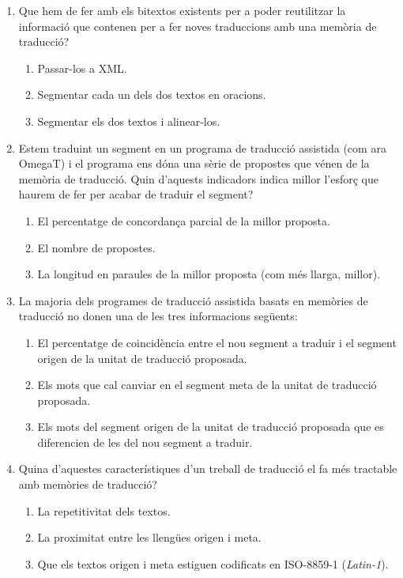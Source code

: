 \begin{enumerate}
\item Que hem de fer amb els bitextos existents per a poder
  reutilitzar la informació que contenen per a fer noves traduccions
  amb una memòria de traducció?
  \begin{enumerate}
  \item Passar-los a XML.
  \item Segmentar cada un dels dos textos en oracions.
  \item Segmentar els dos textos i alinear-los.
  \end{enumerate}

\item Estem traduint un segment en un programa de traducció assistida
  (com ara OmegaT) i el programa ens dóna una sèrie de propostes que
  vénen de la memòria de traducció. Quin d'aquests indicadors indica
  millor l'esforç que haurem de fer per acabar de traduir el segment?
  \begin{enumerate}
  \item El percentatge de concordança parcial de la millor proposta.
  \item El nombre de propostes.
  \item La longitud en paraules de la millor proposta (com més llarga,
    millor).
  \end{enumerate}

\item La majoria dels programes de traducció assistida basats en
  memòries de traducció no donen una de les tres informacions
  següents:
  \begin{enumerate}

  \item El percentatge de coincidència entre el nou segment a traduir
    i el segment origen de la unitat de traducció proposada.
  \item Els mots que cal canviar en el segment meta de la unitat de
    traducció proposada.
  \item Els mots del segment origen de la unitat de traducció
    proposada que es diferencien de les del nou segment a traduir.
  \end{enumerate}

\item Quina d'aquestes característiques d'un treball de traducció el
  fa més tractable amb memòries de traducció?
  \begin{enumerate}
  \item La repetitivitat dels textos.
  \item La proximitat entre les llengües origen i meta.
  \item Que els textos origen i meta estiguen codificats en ISO-8859-1
    (\emph{Latin-1}).
  \end{enumerate}


\end{enumerate}
